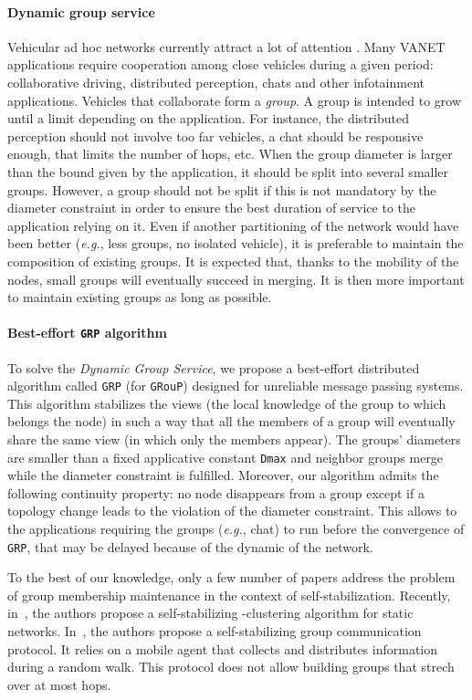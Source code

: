 \documentclass[11pt,english]{article}
\newcommand{\Latin}[1]{\textit{#1}}
\newcommand{\eg}{\Latin{e.g.},\xspace}
\begin{document}
\paragraph{Dynamic group service}
Vehicular ad hoc networks currently attract a lot of attention \cite{BEH04}.
Many VANET applications require cooperation among close vehicles during a given
period: collaborative driving, distributed perception, chats and other
infotainment applications.
Vehicles that collaborate form a \emph{group}. A group is intended to grow
until a limit depending on the application. For instance, the distributed
perception should not involve too far vehicles, a chat should be responsive
enough, that limits the number of hops, etc.
When the group diameter is larger than the bound given by the application, it
should be split into several smaller groups.
However, a group should not be split if this is not mandatory by the diameter
constraint in order to ensure the best duration of service to the application
relying on it.
Even if another partitioning of the network would have been better (\eg less
groups, no isolated vehicle), it is preferable to maintain the composition of
existing groups. It is expected that, thanks to the mobility of the nodes, small
groups will eventually succeed in merging. It is then more important to 
maintain existing groups as long as possible.

\paragraph{Best-effort \texttt{GRP} algorithm}
To solve the \emph{Dynamic Group Service}, we propose a best-effort distributed
algorithm called \texttt{GRP} (for \texttt{GRouP}) designed for unreliable
message passing systems.
This algorithm stabilizes the views (the local knowledge of the group to which
belongs the node) in such a way that all the members of a group will eventually
share the same view (in which only the members appear). The groups' diameters
are smaller than a fixed applicative constant \texttt{Dmax} and neighbor groups
merge while the diameter constraint is fulfilled. Moreover, our algorithm admits
the following continuity property: no node disappears from a group except if a
topology change leads to the violation of the diameter constraint.
This allows to the applications requiring the groups (\eg chat) to run before
the convergence of \texttt{GRP}, that may be delayed because of the dynamic of
the network.

To the best of our knowledge, only a few number of papers address the problem
of group membership maintenance in the context of self-stabilization.  Recently,
in~\cite{DLV08}, the authors propose a self-stabilizing -clustering algorithm
for static networks.  In~\cite{TMC06}, the authors propose a self-stabilizing
group communication protocol.  It relies on a mobile agent that collects and
distributes information during a random walk.  This protocol does not allow 
building groups that strech over at most  hops.
\end{document}
